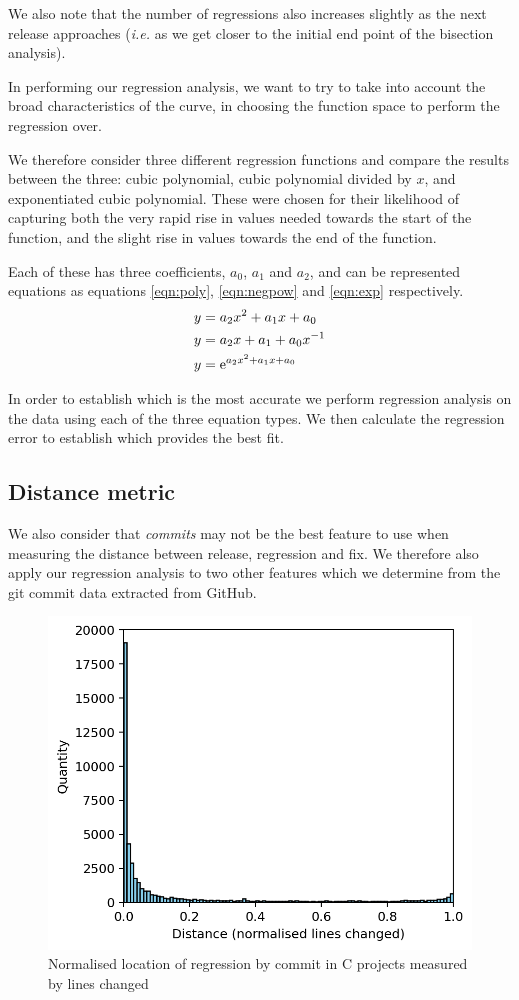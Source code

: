\documentclass[pdflatex, sn-mathphys, referee]{sn-jnl}%
\theoremstyle{thmstyleone}%
\theoremstyle{thmstyletwo}%
\theoremstyle{thmstylethree}%
\def\ie{{\it i.e.}}
\newcommand{\esup}[1]{{\rm e}^{#1}}
\theoremstyle{thmstyleone}
\begin{document}
We also note that the number of regressions also increases slightly as the next release approaches (\ie\/ as we get closer to the initial end point of the bisection analysis).

In performing our regression analysis, we want to try to take into account the broad characteristics of the curve, in choosing the function space to perform the regression over.

We therefore consider three different regression functions and compare the results between the three: cubic polynomial, cubic polynomial divided by $x$, and exponentiated cubic polynomial. These were chosen for their likelihood of capturing both the very rapid rise in values needed towards the start of the function, and the slight rise in values towards the end of the function.

Each of these has three coefficients, $a_0$, $a_1$ and $a_2$, and can be represented equations as equations \ref{eqn:poly}, \ref{eqn:negpow} and \ref{eqn:exp} respectively.
\begin{align}
y &= a_2 x^2 + a_1 x + a_0 \label{eqn:poly} \\
y &= a_2 x + a_1 + a_0 x^{-1} \label{eqn:negpow} \\
y &= \esup{a_2 x^2 + a_1 x + a_0} \label{eqn:exp}
\end{align}

In order to establish which is the most accurate we perform regression analysis on the data using each of the three equation types. We then calculate the regression error to establish which provides the best fit.

\subsection{Distance metric}

We also consider that {\it commits\/} may not be the best feature to use when measuring the distance between release, regression and fix. We therefore also apply our regression analysis to two other features which we determine from the git commit data extracted from GitHub.

\begin{figure}[t]
\centering
\includegraphics[width=0.7\columnwidth]{Fig2}%
\caption{\label{fig:c-lines}Normalised location of regression by commit in C projects measured by lines changed}
\end{figure}
\end{document}
